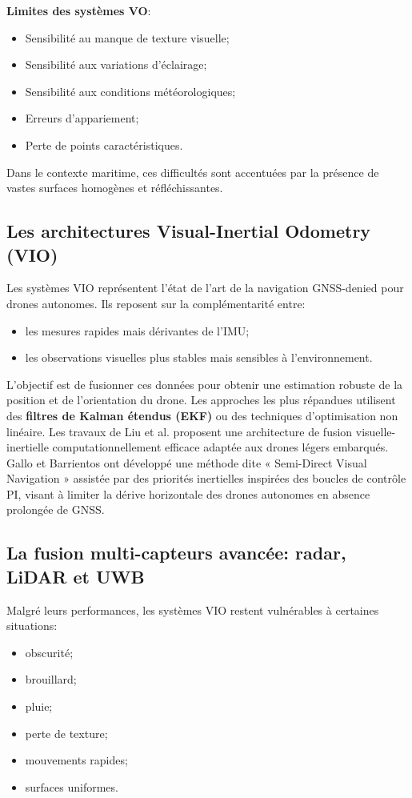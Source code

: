 \documentclass[12pt, a4paper, twoside, openright]{report}
\begin{document}
\textbf{Limites des systèmes VO}:
\begin{itemize}
    \item Sensibilité au manque de texture visuelle;
    \item Sensibilité aux variations d’éclairage;
    \item Sensibilité aux conditions météorologiques;
    \item Erreurs d’appariement;
    \item Perte de points caractéristiques.
\end{itemize}

Dans le contexte maritime, ces difficultés sont accentuées par la présence de vastes surfaces homogènes et réfléchissantes.

\subsection{Les architectures Visual-Inertial Odometry (VIO)}
Les systèmes VIO représentent l’état de l’art de la navigation GNSS-denied pour drones autonomes. Ils reposent sur la complémentarité entre:
\begin{itemize}
    \item les mesures rapides mais dérivantes de l’IMU;
    \item les observations visuelles plus stables mais sensibles à l’environnement.
\end{itemize}

L’objectif est de fusionner ces données pour obtenir une estimation robuste de la position et de l’orientation du drone. Les approches les plus répandues utilisent des \textbf{filtres de Kalman étendus (EKF)} ou des techniques d’optimisation non linéaire.
Les travaux de Liu et al.\cite{liu2020visual} proposent une architecture de fusion visuelle-inertielle computationnellement efficace adaptée aux drones légers embarqués. Gallo et Barrientos \cite{gallo2023semi} ont développé une méthode dite « Semi-Direct Visual Navigation » assistée par des priorités inertielles inspirées des boucles de contrôle PI, visant à limiter la dérive horizontale des drones autonomes en absence prolongée de GNSS.

\subsection{La fusion multi-capteurs avancée: radar, LiDAR et UWB}
Malgré leurs performances, les systèmes VIO restent vulnérables à certaines situations:
\begin{itemize}
    \item obscurité;
    \item brouillard;
    \item pluie;
    \item perte de texture;
    \item mouvements rapides;
    \item surfaces uniformes.
\end{itemize}
\end{document}
